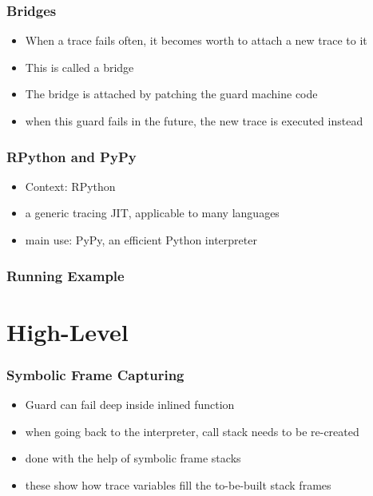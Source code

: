 \documentclass[utf8x]{beamer}
\begin{document}

\begin{frame}
  \frametitle{Bridges}
  \begin{itemize}
      \item When a trace fails often, it becomes worth to attach a new trace to it
          \item This is called a bridge
          \item The bridge is attached by patching the guard machine code
          \item when this guard fails in the future, the new trace is executed instead
  \end{itemize}
\end{frame}

\begin{frame}
  \frametitle{RPython and PyPy}
  \begin{itemize}
      \item Context: RPython
      \item a generic tracing JIT, applicable to many languages
      \item main use: PyPy, an efficient Python interpreter
  \end{itemize}
\end{frame}

\begin{frame}
  \frametitle{Running Example}
\end{frame}

\section{High-Level}

\begin{frame}
  \frametitle{Symbolic Frame Capturing}
  \begin{itemize}
      \item Guard can fail deep inside inlined function
      \item when going back to the interpreter, call stack needs to be re-created
      \item done with the help of symbolic frame stacks
      \item these show how trace variables fill the to-be-built stack frames
  \end{itemize}
\end{frame}
\end{document}
